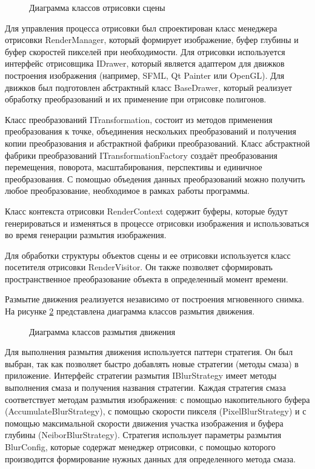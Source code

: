 \begin{figure}[h]
    \centering
    
    \caption{Диаграмма классов отрисовки сцены}
    \label{fig:uml_render}
\end{figure}

Для управления процесса отрисовки был спроектирован класс менеджера отрисовки RenderManager, который формирует изображение, буфер глубины и буфер  скоростей пикселей при необходимости. Для отрисовки используется интерфейс отрисовщика IDrawer, который является адаптером для движков построения изображения (например, SFML, Qt Painter или OpenGL). Для движков был подготовлен абстрактный класс BaseDrawer, который реализует обработку преобразований и их применение при отрисовке полигонов.  

Класс преобразований ITransformation, состоит из методов применения преобразования к точке, объединения нескольких преобразований и получения копии преобразования и абстрактной фабрики преобразований.
Класс абстрактной фабрики преобразований ITransformationFactory создаёт преобразования перемещения, поворота, масштабирования, перспективы и единичное преобразования. С помощью объедения данных преобразований можно получить любое преобразование, необходимое в рамках работы программы.

Класс контекста отрисовки RenderContext содержит буферы, которые будут генерироваться и изменяться в процессе отрисовки изображения и использоваться во время генерации размытия изображения.

Для обработки структуры объектов сцены и ее отрисовки используется класс посетителя отрисовки RenderVisitor. Он также позволяет сформировать пространственное преобразование объекта в определенный момент времени.

Размытие движения реализуется независимо от построения мгновенного снимка. На рисунке \ref{fig:uml_render} представлена диаграмма классов размытия движения.  

\begin{figure}[h]
    \centering
    
    \caption{Диаграмма классов размытия движения}
    \label{fig:uml_render}
\end{figure}

Для выполнения размытия движения используется паттерн стратегия. Он был выбран, так как позволяет быстро добавлять новые стратегии (методы смаза) в приложение. Интерфейс стратегии размытия IBlurStrategy имеет методы выполнения смаза и получения названия стратегии. Каждая стратегия смаза соответствует методам размытия изображения: с помощью накопительного буфера (AccumulateBlurStrategy), с помощью скорости пикселя (PixelBlurStrategy) и с помощью максимальной скорости
движения участка изображения и буфера глубины (NeiborBlurStrategy). Стратегия использует параметры размытия BlurConfig, которые содержат менеджер отрисовки, с помощью которого производится формирование нужных данных для определенного метода смаза.

